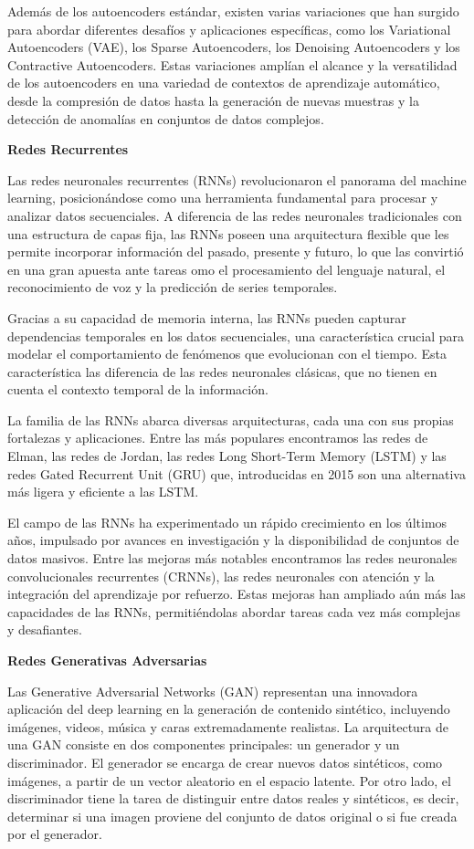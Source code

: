 \documentclass[
  a4paper,
  DIV=11,
  numbers=noendperiod]{scrreprt}
\begin{document}
Además de los autoencoders estándar, existen varias variaciones que han
surgido para abordar diferentes desafíos y aplicaciones específicas,
como los Variational Autoencoders (VAE), los Sparse Autoencoders, los
Denoising Autoencoders y los Contractive Autoencoders. Estas variaciones
amplían el alcance y la versatilidad de los autoencoders en una variedad
de contextos de aprendizaje automático, desde la compresión de datos
hasta la generación de nuevas muestras y la detección de anomalías en
conjuntos de datos complejos.

\textbf{Redes Recurrentes}

Las redes neuronales recurrentes (RNNs) revolucionaron el panorama del
machine learning, posicionándose como una herramienta fundamental para
procesar y analizar datos secuenciales. A diferencia de las redes
neuronales tradicionales con una estructura de capas fija, las RNNs
poseen una arquitectura flexible que les permite incorporar información
del pasado, presente y futuro, lo que las convirtió en una gran apuesta
ante tareas omo el procesamiento del lenguaje natural, el reconocimiento
de voz y la predicción de series temporales.

Gracias a su capacidad de memoria interna, las RNNs pueden capturar
dependencias temporales en los datos secuenciales, una característica
crucial para modelar el comportamiento de fenómenos que evolucionan con
el tiempo. Esta característica las diferencia de las redes neuronales
clásicas, que no tienen en cuenta el contexto temporal de la
información.

La familia de las RNNs abarca diversas arquitecturas, cada una con sus
propias fortalezas y aplicaciones. Entre las más populares encontramos
las redes de Elman, las redes de Jordan, las redes Long Short-Term
Memory (LSTM) y las redes Gated Recurrent Unit (GRU) que, introducidas
en 2015 son una alternativa más ligera y eficiente a las LSTM.

El campo de las RNNs ha experimentado un rápido crecimiento en los
últimos años, impulsado por avances en investigación y la disponibilidad
de conjuntos de datos masivos. Entre las mejoras más notables
encontramos las redes neuronales convolucionales recurrentes (CRNNs),
las redes neuronales con atención y la integración del aprendizaje por
refuerzo. Estas mejoras han ampliado aún más las capacidades de las
RNNs, permitiéndolas abordar tareas cada vez más complejas y
desafiantes.

\textbf{Redes Generativas Adversarias}

Las Generative Adversarial Networks (GAN) representan una innovadora
aplicación del deep learning en la generación de contenido sintético,
incluyendo imágenes, videos, música y caras extremadamente realistas. La
arquitectura de una GAN consiste en dos componentes principales: un
generador y un discriminador. El generador se encarga de crear nuevos
datos sintéticos, como imágenes, a partir de un vector aleatorio en el
espacio latente. Por otro lado, el discriminador tiene la tarea de
distinguir entre datos reales y sintéticos, es decir, determinar si una
imagen proviene del conjunto de datos original o si fue creada por el
generador.
\end{document}
